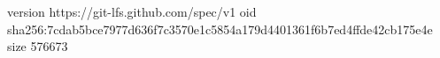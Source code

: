 version https://git-lfs.github.com/spec/v1
oid sha256:7cdab5bce7977d636f7c3570e1c5854a179d4401361f6b7ed4ffde42cb175e4e
size 576673
